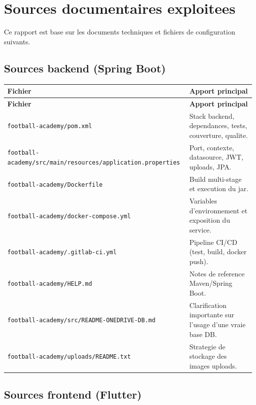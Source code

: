 \chapter{Sources documentaires exploitees}

Ce rapport est base sur les documents techniques et fichiers de configuration suivants.

\section{Sources backend (Spring Boot)}

\begin{longtable}{p{} p{}}
\toprule
\textbf{Fichier} & \textbf{Apport principal} \\
\midrule
\endfirsthead
\toprule
\textbf{Fichier} & \textbf{Apport principal} \\
\midrule
\endhead
\texttt{football-academy/pom.xml} & Stack backend, dependances, tests, couverture, qualite. \\
\texttt{football-academy/src/main/resources/application.properties} & Port, contexte, datasource, JWT, uploads, JPA. \\
\texttt{football-academy/Dockerfile} & Build multi-stage et execution du jar. \\
\texttt{football-academy/docker-compose.yml} & Variables d'environnement et exposition du service. \\
\texttt{football-academy/.gitlab-ci.yml} & Pipeline CI/CD (test, build, docker push). \\
\texttt{football-academy/HELP.md} & Notes de reference Maven/Spring Boot. \\
\texttt{football-academy/src/README-ONEDRIVE-DB.md} & Clarification importante sur l'usage d'une vraie base DB. \\
\texttt{football-academy/uploads/README.txt} & Strategie de stockage des images uploads. \\
\bottomrule
\end{longtable}

\section{Sources frontend (Flutter)}

